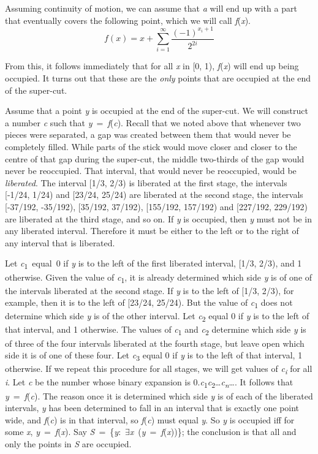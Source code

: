 \documentclass[
  10pt,
  letterpaper,
  DIV=11,
  numbers=noendperiod,
  twoside]{scrartcl}
\begin{document}
Assuming continuity of motion, we can assume that \emph{a} will end up
with a part that eventually covers the following point, which we will
call \emph{f}(\emph{x}).
\[f(x) = x + \sum_{i=1}^{\infty}\frac{(-1)^{x_i + 1}}{2^{2i}}\]

From this, it follows immediately that for all \emph{x} in {[}0, 1),
\emph{f}(\emph{x}) will end up being occupied. It turns out that these
are the \emph{only} points that are occupied at the end of the
super-cut.

Assume that a point \emph{y} is occupied at the end of the super-cut. We
will construct a number \emph{c} such that
\emph{y}~=~\emph{f}(\emph{c}). Recall that we noted above that whenever
two pieces were separated, a gap was created between them that would
never be completely filled. While parts of the stick would move closer
and closer to the centre of that gap during the super-cut, the middle
two-thirds of the gap would never be reoccupied. That interval, that
would never be reoccupied, would be \emph{liberated}. The interval
{[}1/3, 2/3) is liberated at the first stage, the intervals {[}-1/24,
1/24) and {[}23/24, 25/24) are liberated at the second stage, the
intervals {[}-37/192, -35/192), {[}35/192, 37/192), {[}155/192, 157/192)
and {[}227/192, 229/192) are liberated at the third stage, and so on. If
\emph{y} is occupied, then \emph{y} must not be in any liberated
interval. Therefore it must be either to the left or to the right of any
interval that is liberated.

Let \emph{c}\textsubscript{1}~equal~0 if \emph{y} is to the left of the
first liberated interval, {[}1/3, 2/3), and 1 otherwise. Given the value
of \emph{c}\textsubscript{1}, it is already determined which side
\emph{y} is of one of the intervals liberated at the second stage. If
\emph{y} is to the left of {[}1/3, 2/3), for example, then it is to the
left of {[}23/24, 25/24). But the value of \emph{c}\textsubscript{1}
does not determine which side \emph{y} is of the other interval. Let
\emph{c}\textsubscript{2} equal 0 if \emph{y} is to the left of that
interval, and 1 otherwise. The values of \emph{c}\textsubscript{1} and
\emph{c}\textsubscript{2} determine which side \emph{y} is of three of
the four intervals liberated at the fourth stage, but leave open which
side it is of one of these four. Let \emph{c}\textsubscript{3} equal 0
if \emph{y} is to the left of that interval, 1 otherwise. If we repeat
this procedure for all stages, we will get values of
\emph{c\textsubscript{i}} for all \emph{i}. Let \emph{c} be the number
whose binary expansion is
0.\emph{c}\textsubscript{1}\emph{c}\textsubscript{2}\ldots{}\emph{c\textsubscript{n}}\ldots.
It follows that \emph{y}~=~\emph{f}(\emph{c}). The reason once it is
determined which side \emph{y} is of each of the liberated intervals,
\emph{y} has been determined to fall in an interval that is exactly one
point wide, and \emph{f}(\emph{c}) is in that interval, so
\emph{f}(\emph{c}) must equal \emph{y}. So \emph{y} is occupied iff for
some \emph{x}, \emph{y}~=~\emph{f}(\emph{x}). Say
\emph{S}~=~\{\emph{y}:~\({\exists}\)\emph{x}~(\emph{y}~=~\emph{f}(\emph{x}))\};
the conclusion is that all and only the points in \emph{S} are occupied.
\end{document}
